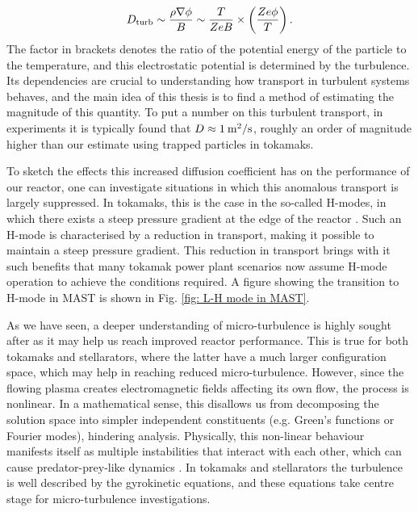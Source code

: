\begin{equation}
    D_{\rm turb} \sim \frac{\rho \nabla \phi}{B} \sim \frac{T}{ZeB} \times \left( \frac{Ze\phi}{T} \right).
\end{equation}
The factor in brackets denotes the ratio of the potential energy of the particle to the temperature, and this electrostatic potential is determined by the turbulence. Its dependencies are crucial to understanding how transport in turbulent systems behaves, and the main idea of this thesis is to find a method of estimating the magnitude of this quantity. To put a number on this turbulent transport, in experiments it is typically found that $D \approx 1 \: {\rm m^2/s}$, roughly an order of magnitude higher than our estimate using trapped particles in tokamaks.
\par 

To sketch the effects this increased diffusion coefficient has on the performance of our reactor, one can investigate situations in which this anomalous transport is largely suppressed. In tokamaks, this is the case in the so-called H-modes, in which there exists a steep pressure gradient at the edge of the reactor \cite{itoh1988model,burrell1992physics,groebner1993emerging,burrell2005advances}. Such an H-mode is characterised by a reduction in transport, making it possible to maintain a steep pressure gradient. This reduction in transport brings with it such benefits that many tokamak power plant scenarios now assume H-mode operation to achieve the conditions required. A figure showing the transition to H-mode in MAST is shown in Fig. \ref{fig: L-H mode in MAST}. \par 

As we have seen, a deeper understanding of micro-turbulence is highly sought after as it may help us reach improved reactor performance. This is true for both tokamaks and stellarators, where the latter have a much larger configuration space, which may help in reaching reduced micro-turbulence. However, since the flowing plasma creates electromagnetic fields affecting its own flow, the process is nonlinear. In a mathematical sense, this disallows us from decomposing the solution space into simpler independent constituents (e.g. Green's functions or Fourier modes), hindering analysis. Physically, this non-linear behaviour manifests itself as multiple instabilities that interact with each other, which can cause predator-prey-like dynamics \cite{morel2013characterization}. In tokamaks and stellarators the turbulence is well described by the gyrokinetic equations, and these equations take centre stage for micro-turbulence investigations.

